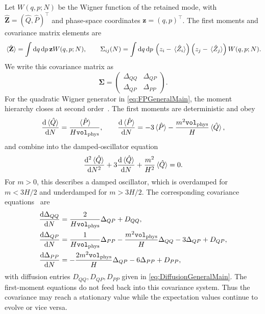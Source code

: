 \documentclass{article}
\newcommand{\Vphys}{\mathtt{vol}_{\rm phys}}
\numberwithin{equation}{section}
\begin{document}
	Let \(W(q,p;N)\) be the Wigner function of the retained mode, with \(\hat{\mathbf{Z}}=(\hat Q,\hat P)^\top\) and phase-space coordinates \(\mathbf{z}=(q,p)^\top\). The first moments and covariance matrix elements are
	\begin{equation}
		\ev*{\hat{\mathbf{Z}}}=\int \dd q\,\dd p\,\mathbf{z} W(q,p;N),
		\qquad
		\Sigma_{ij}(N) = \int \dd q\,\dd p\, \left(z_i-\ev*{\hat{Z}_i}\right) \left(z_j-\ev*{\hat{Z}_j}\right)W(q,p;N).
	\end{equation}
	We write this covariance matrix as
	\[
	\mathbf{\Sigma}=
	\begin{pmatrix}
		\Delta_{QQ} & \Delta_{QP}\\ \Delta_{QP} & \Delta_{PP}
	\end{pmatrix}.
	\]
	For the quadratic Wigner generator in \cref{eq:FPGeneralMain}, the moment hierarchy closes at second order~\cite{MyPaper}. The first moments are deterministic and obey
	\begin{equation}\label{eq:massiveDriftBoth}
		\frac{\dd \ev*{\hat Q}}{\dd N}=\frac{\ev*{\hat P}}{H\Vphys}, \qquad \frac{\dd \ev*{\hat P}}{\dd N}=-3\ev*{\hat P}-\frac{m^2\Vphys}{H}\ev*{\hat Q} ,
	\end{equation}
	and combine into the damped-oscillator equation
\begin{equation}\label{eq:dampedOscillator}
		\frac{\dd ^2 \ev*{\hat Q}}{\dd N^2}+3\frac{\dd \ev*{\hat Q}}{\dd N}+\frac{m^2}{H^2}\ev*{\hat Q}=0.
	\end{equation}
For $m>0$, this describes a damped oscillator, which is overdamped for $m<3H/2$ and underdamped for $m>3H/2$.
The corresponding covariance equations~\cite{MyPaper} are
    \begin{align}
	    \dv{\Delta_{QQ}}{N}
		&=\frac{2}{H\Vphys}\Delta_{QP}+D_{QQ},
		\nonumber\\
		\dv{\Delta_{QP}}{N}
		&=\frac{1}{H\Vphys}\Delta_{PP}
		-\frac{m^2\Vphys}{H}\Delta_{QQ}
		-3\Delta_{QP}+D_{QP},
		\label{eq:CovComponentMain}
		\\
		\dv{\Delta_{PP}}{N}
		&=-\frac{2m^2\Vphys}{H}\Delta_{QP}
		-6\Delta_{PP}+D_{PP},
		\nonumber
	\end{align}
	with diffusion entries \(D_{QQ},D_{QP},D_{PP}\) given in \cref{eq:DiffusionGeneralMain}. The first-moment equations do not feed back into this covariance system. Thus the covariance may reach a stationary value while the expectation values continue to evolve or vice versa.
\end{document}
